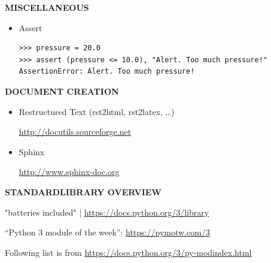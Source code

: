 \documentclass[9pt,a4wide]{extarticle}
\begin{document}
\bigskip
{\LARGE\bf MISCELLANEOUS}
{}

\begin{itemize}
\item Assert

\begin{verbatim}
>>> pressure = 20.0
>>> assert (pressure <= 10.0), "Alert. Too much pressure!"
AssertionError: Alert. Too much pressure!
\end{verbatim}

\end{itemize}



\bigskip
{\LARGE\bf DOCUMENT CREATION}
{}

\begin{itemize}

\item Restructured Text (rst2html, rst2latex, \dots{})

   \url{http://docutils.sourceforge.net}

\item Sphinx

   \url{http://www.sphinx-doc.org}

\end{itemize}




\bigskip
{\LARGE\bf STANDARDLIBRARY OVERVIEW}
{}

"batteries included" | \url{https://docs.python.org/3/library}

``Python 3 module of the week'': \url{https://pymotw.com/3}

Following list is from \url{https://docs.python.org/3/py-modindex.html}
\end{document}

